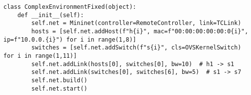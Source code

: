 \begin{verbatim}
class ComplexEnvironmentFixed(object):
    def __init__(self):
        self.net = Mininet(controller=RemoteController, link=TCLink)
        hosts = [self.net.addHost(f"h{i}", mac=f"00:00:00:00:00:0{i}", ip=f"10.0.0.{i}") for i in range(1,8)]
        switches = [self.net.addSwitch(f"s{i}", cls=OVSKernelSwitch) for i in range(1,11)]
        self.net.addLink(hosts[0], switches[0], bw=10)  # h1 -> s1
        self.net.addLink(switches[0], switches[6], bw=5)  # s1 -> s7
        self.net.build()
        self.net.start()
\end{verbatim}
